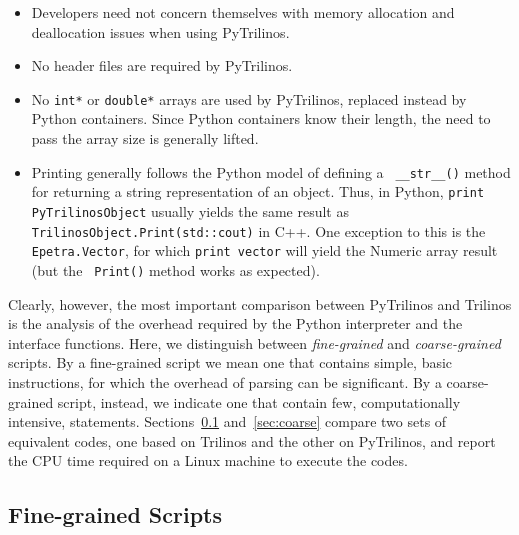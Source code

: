 \documentclass[acmtocl]{acmtrans2m}
\newcommand{\PyTrilinos}{{PyTrilinos}}
\newcommand{\teuchos}{{Teuchos}}
\begin{document}
\begin{itemize}

\item Developers need not concern themselves with memory allocation
  and deallocation issues when using \PyTrilinos.

\item No header files are required by \PyTrilinos.

\item No {\tt int*} or {\tt double*} arrays are used by \PyTrilinos,
  replaced instead by Python containers.  Since Python containers know
  their length, the need to pass the array size is generally lifted.

\item Printing generally follows the Python model of defining a {\tt
  \_\_str\_\_()} method for returning a string representation of an
  object.  Thus, in Python, {\tt print PyTrilinosObject} usually
  yields the same result as {\tt TrilinosObject.Print(std::cout)} in
  C++.  One exception to this is the {\tt Epetra.Vector}, for which
  {\tt print vector} will yield the Numeric array result (but the {\tt
    Print()} method works as expected).


\end{itemize}

Clearly, however, the most important comparison between PyTrilinos and
Trilinos is the analysis of the overhead required by the Python
interpreter and the interface functions. Here, we distinguish between
{\sl fine-grained} and {\sl coarse-grained} scripts. By a fine-grained
script we mean one that contains simple, basic instructions, for which
the overhead of parsing can be significant. By a coarse-grained
script, instead, we indicate one that contain few, computationally
intensive, statements.  Sections~\ref{sec:fine} and~\ref{sec:coarse}
compare two sets of equivalent codes, one based on Trilinos and the
other on PyTrilinos, and report the CPU time required on a Linux
machine to execute the codes.

\subsection{Fine-grained Scripts}
\label{sec:fine}
\end{document}
